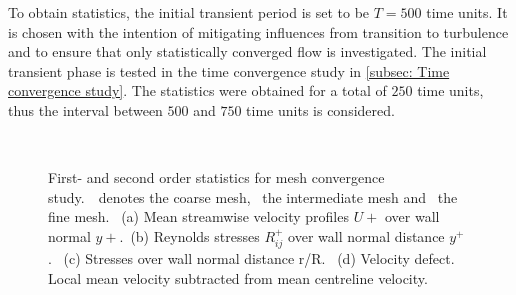 To obtain statistics, the initial transient period is set to be $T = 500$ time units.
It is chosen with the intention of mitigating influences from transition to turbulence and to ensure that only statistically converged flow is investigated.
The initial transient phase is tested in the time convergence study in \autoref{subsec: Time convergence study}.
The statistics were obtained for a total of $250$ time units, thus the interval between $500$ and $750$ time units is considered.
\begin{figure}[h!]
    \centering
    \begin{subfigure}[t]{0.495\textwidth}
        \centering
        \subcaption{}
        
        \label{subfig: grid convergence uplus}
    \end{subfigure}
    \hfill
    \begin{subfigure}[t]{0.495\textwidth}
        \centering
        \subcaption{}
        
        \label{subfig: grid convergence RS}
    \end{subfigure}
    \\[-30pt]
    \begin{subfigure}[t]{0.495\textwidth}
        \centering
        \subcaption{}
        
        \label{subfig: grid convergence total stress}
    \end{subfigure}
    \hfill
    \begin{subfigure}[t]{0.495\textwidth}
        \centering
        \subcaption{}
        
        \label{subfig: mesh convergence velocity defect}
    \end{subfigure}
    \plotverticalspacing
    \caption[First- and second order statistics for mesh convergence study]{First- and second order statistics for mesh convergence study.\ \coarseMeshSymbol \ denotes the coarse mesh, \intermediatMeshSymbol \ the intermediate mesh and \fineMeshSymbol \ the fine mesh.~
    (a) Mean streamwise velocity profiles $U+$ over wall normal $y+$.~(b) Reynolds stresses $R_{ij}^+$ over wall normal distance $y^+$.~
    (c) Stresses over wall normal distance r/R.~
    (d) Velocity defect. Local mean velocity subtracted from mean centreline velocity.}
    \label{fig: Mesh refinement study}
\end{figure}
